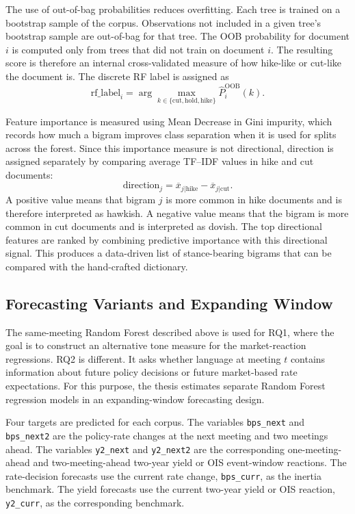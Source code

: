 The use of out-of-bag probabilities reduces overfitting. Each tree is
trained on a bootstrap sample of the corpus. Observations not included
in a given tree's bootstrap sample are out-of-bag for that tree. The OOB
probability for document \(i\) is computed only from trees that did not
train on document \(i\). The resulting score is therefore an internal
cross-validated measure of how hike-like or cut-like the document is.
The discrete RF label is assigned as
\[
\text{rf\_label}_i
=
\arg\max_{k \in \{\text{cut},\text{hold},\text{hike}\}}
\hat{P}^{\text{OOB}}_i(k).
\]

Feature importance is measured using Mean Decrease in Gini impurity,
which records how much a bigram improves class separation when it is
used for splits across the forest. Since this importance measure is not
directional, direction is assigned separately by comparing average
TF--IDF values in hike and cut documents:
%
\begin{equation}
\label{eq:direction}
\text{direction}_j
=
\overline{x}_{j|\text{hike}}
-
\overline{x}_{j|\text{cut}}.
\end{equation}
%
A positive value means that bigram \(j\) is more common in hike
documents and is therefore interpreted as hawkish. A negative value means
that the bigram is more common in cut documents and is interpreted as
dovish. The top directional features are ranked by combining predictive
importance with this directional signal. This produces a data-driven
list of stance-bearing bigrams that can be compared with the
hand-crafted dictionary.

\subsection{Forecasting Variants and Expanding Window}
\label{sec:meth_rf_rq2}

The same-meeting Random Forest described above is used for RQ1, where
the goal is to construct an alternative tone measure for the
market-reaction regressions. RQ2 is different. It asks whether language
at meeting \(t\) contains information about future policy decisions or
future market-based rate expectations. For this purpose, the thesis
estimates separate Random Forest regression models in an expanding-window
forecasting design.

Four targets are predicted for each corpus. The variables
\texttt{bps\_next} and \texttt{bps\_next2} are the policy-rate changes
at the next meeting and two meetings ahead. The variables
\texttt{y2\_next} and \texttt{y2\_next2} are the corresponding
one-meeting-ahead and two-meeting-ahead two-year yield or OIS
event-window reactions. The rate-decision forecasts use the current
rate change, \texttt{bps\_curr}, as the inertia benchmark. The yield
forecasts use the current two-year yield or OIS reaction,
\texttt{y2\_curr}, as the corresponding benchmark.

